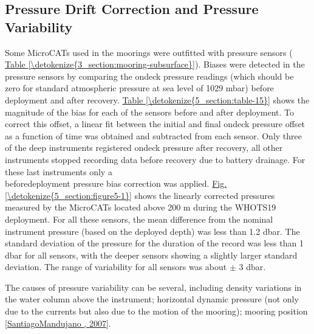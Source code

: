 \documentclass[a4paper,10pt,english,openany,oneside]{sphinxmanual}
\begin{document}
\subsection{Pressure Drift Correction and Pressure Variability}
\label{\detokenize{5_section:pressure-drift-correction-and-pressure-variability}}
\sphinxAtStartPar
Some MicroCATs used in the moorings were outfitted with pressure sensors (
\hyperref[\detokenize{3_section:mooring-subsurface}]{Table \ref{\detokenize{3_section:mooring-subsurface}}}). Biases were detected in the pressure sensors by
comparing the on\sphinxhyphen{}deck pressure readings (which should be zero for standard
atmospheric pressure at sea level of 1029 mbar) before deployment and after recovery.
\hyperref[\detokenize{5_section:table-15}]{Table \ref{\detokenize{5_section:table-15}}} shows the magnitude of the bias for each of the sensors
before and after deployment. To correct this offset, a linear fit between the
initial and final on\sphinxhyphen{}deck pressure offset as a function of time was obtained
and subtracted from each sensor. Only three of the deep instruments registered
on\sphinxhyphen{}deck pressure after recovery, all other instruments stopped recording data
before recovery due to battery drainage. For these last instruments only a\\
before\sphinxhyphen{}deployment pressure bias correction was applied.
\hyperref[\detokenize{5_section:figure5-1}]{Fig.\@ \ref{\detokenize{5_section:figure5-1}}} shows the linearly
corrected pressures measured by the MicroCATs located above 200 m during the
WHOTS\sphinxhyphen{}19 deployment. For all these sensors, the mean difference from the
nominal instrument pressure (based on the deployed depth) was less than 1.2
dbar. The standard deviation of the pressure for the duration of the record was
less than 1 dbar for all sensors, with the deeper sensors showing a slightly
larger standard deviation. The range of variability for all sensors was about \(\pm\)
3 dbar.

\sphinxAtStartPar
The causes of pressure variability can be several, including density variations
in the water column above the instrument; horizontal dynamic pressure (not only
due to the currents but also due to the motion of the mooring); mooring
position {[}\hyperlink{cite.references:id15}{Santiago\sphinxhyphen{}Mandujano , 2007}{]}.
\end{document}

